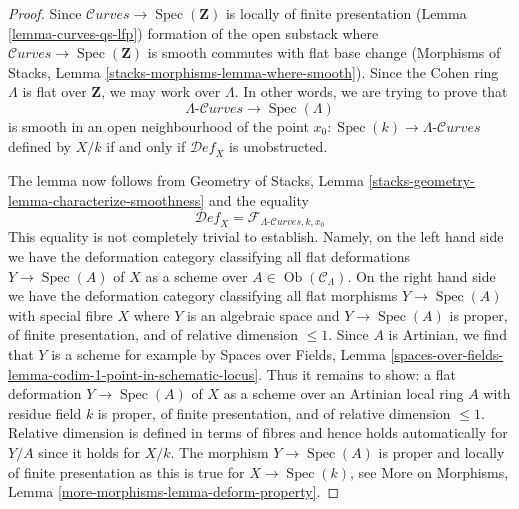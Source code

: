 \documentclass[10pt,a4paper]{amsart}
\theoremstyle{plain}
\theoremstyle{definition}
\theoremstyle{remark}
\numberwithin{equation}{subsection}
\def\Spec{\mathop{\mathrm{Spec}}}
\def\Ob{\mathop{\mathrm{Ob}}\nolimits}
\def\Curvesstack{\mathcal{C}\!\mathit{urves}}
\def\Deformationcategory{\mathcal{D}\!\mathit{ef}}
\begin{document}
\begin{proof}
Since $\Curvesstack \longrightarrow \Spec(\mathbf{Z})$ is locally
of finite presentation (Lemma \ref{lemma-curves-qs-lfp})
formation of the open substack where
$\Curvesstack \longrightarrow \Spec(\mathbf{Z})$ is smooth commutes with
flat base change
(Morphisms of Stacks, Lemma \ref{stacks-morphisms-lemma-where-smooth}).
Since the Cohen ring $\Lambda$ is flat over $\mathbf{Z}$,
we may work over $\Lambda$. In other words, we are trying to prove that
$$
\Lambda\text{-}\Curvesstack \longrightarrow \Spec(\Lambda)
$$
is smooth in an open neighbourhood of the point
$x_0 : \Spec(k) \to \Lambda\text{-}\Curvesstack$
defined by $X/k$ if and only if $\Deformationcategory_X$ is unobstructed.

\medskip\noindent
The lemma now follows from
Geometry of Stacks, Lemma \ref{stacks-geometry-lemma-characterize-smoothness}
and the equality
$$
\Deformationcategory_X =
\mathcal{F}_{\Lambda\text{-}\Curvesstack, k, x_0}
$$
This equality is not completely trivial to establish. Namely, on the left
hand side we have the deformation category classifying all flat deformations
$Y \to \Spec(A)$ of $X$ as a scheme over $A \in \Ob(\mathcal{C}_\Lambda)$.
On the right hand side we have the deformation category classifying all
flat morphisms $Y \to \Spec(A)$ with special fibre $X$
where $Y$ is an algebraic space and
$Y \to \Spec(A)$ is proper, of finite presentation, and of
relative dimension $\leq 1$. Since $A$ is Artinian, we find
that $Y$ is a scheme for example by Spaces over Fields, Lemma
\ref{spaces-over-fields-lemma-codim-1-point-in-schematic-locus}.
Thus it remains to show: a flat deformation $Y \to \Spec(A)$ of
$X$ as a scheme over an Artinian local ring $A$ with residue field $k$
is proper, of finite presentation, and of relative dimension $\leq 1$.
Relative dimension is defined in terms of fibres and hence holds
automatically for $Y/A$ since it holds for $X/k$.
The morphism $Y \to \Spec(A)$ is proper and locally of finite presentation
as this is true for $X \to \Spec(k)$, see
More on Morphisms, Lemma \ref{more-morphisms-lemma-deform-property}.
\end{proof}
\end{document}
